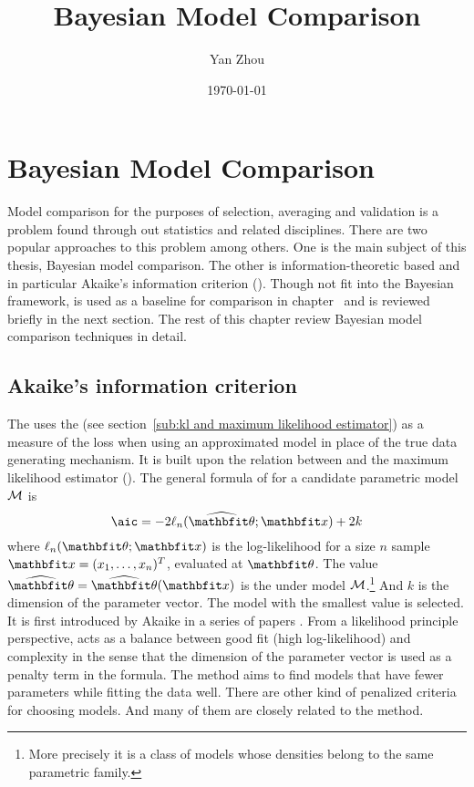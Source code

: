 \documentclass[11pt, hyper, bib, fontset=Minion]{marticle}
\title{Bayesian Model Comparison}
\author{Yan Zhou}
\date{\today}
\begin{document}
\maketitle

\else %

\chapter{Bayesian Model Comparison}
\label{cha:Bayesian Model Comparison}

\fi %

Model comparison for the purposes of selection, averaging and validation is a
problem found through out statistics and related disciplines. There are two
popular approaches to this problem among others. One is the main subject of
this thesis, Bayesian model comparison. The other is information-theoretic
based and in particular Akaike's information criterion (\aic). Though not fit
into the Bayesian framework, \aic is used as a baseline for comparison in
chapter~ and is reviewed briefly in the next section. The rest
of this chapter review Bayesian model comparison techniques in detail.

\section{Akaike's information criterion}
\label{sec:Akaike's information criterion}

The \aic uses the \kl (see section~\ref{sub:kl and maximum likelihood
  estimator}) as a measure of the loss when using an approximated model in
place of the true data generating mechanism. It is built upon the relation
between \kl and the maximum likelihood estimator (\mle). The general formula
of \aic for a candidate parametric model $\mathcal{M}$ is
\begin{equation}
  \text{\aic} = -2\ell_n(\hbth;\bfx) + 2k
\end{equation}
where $\ell_n(\bth;\bfx)$ is the log-likelihood for a size $n$ sample
$\bfx=(x_1,\dots,x_n)^T$, evaluated at $\bth$. The value $\hbth = \hbth(\bfx)$
is the \mle under model $\mathcal{M}$.\footnote{More precisely it is a class of
  models whose densities belong to the same parametric family.} And $k$ is the
dimension of the parameter vector. The model with the smallest \aic value is
selected. It is first introduced by Akaike in a series of papers
\parencite{Akaike:1973uc, Akaike:1974ih, Akaike:1977ul}. From a likelihood
principle perspective, \aic acts as a balance between good fit (high
log-likelihood) and complexity in the sense that the dimension of the
parameter vector is used as a penalty term in the formula.  The \aic method
aims to find models that have fewer parameters while fitting the data well.
There are other kind of penalized criteria for choosing models.  And many of
them are closely related to the \aic method.
\end{document}

